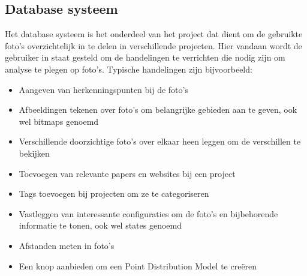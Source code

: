 \subsection{Database systeem}
\label{aanpak_database_systeem}
Het database systeem is het onderdeel van het project dat dient om de gebruikte foto's overzichtelijk in te delen in verschillende projecten. Hier vandaan wordt de gebruiker in staat gesteld om de handelingen te verrichten die nodig zijn om analyse te plegen op foto's. Typische handelingen zijn bijvoorbeeld: 

\begin{itemize}
\item Aangeven van herkenningspunten bij de foto's
\item Afbeeldingen tekenen over foto's om belangrijke gebieden aan te geven, ook wel bitmaps genoemd
\item Verschillende doorzichtige foto's over elkaar heen leggen om de verschillen te bekijken
\item Toevoegen van relevante papers en websites bij een project
\item Tags toevoegen bij projecten om ze te categoriseren
\item Vastleggen van interessante configuraties om de foto's en bijbehorende informatie te tonen, ook wel states genoemd
\item Afstanden meten in foto's
\item Een knop aanbieden om een Point Distribution Model te cre\"{e}ren
\end{itemize}

